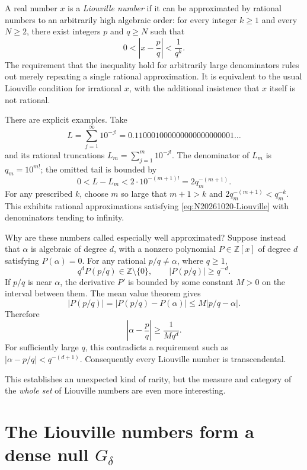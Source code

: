 A real number \(x\) is a \emph{Liouville number} if it can be approximated by rational numbers to an arbitrarily high algebraic order: for every integer \(k\ge1\) and every \(N\ge2\), there exist integers \(p\) and \(q\ge N\) such that
\begin{equation}
 0<\left|x-\frac pq\right|<\frac1{q^k}.
 \label{eq:N20261020-Liouville}
\end{equation}
The requirement that the inequality hold for arbitrarily large denominators rules out merely repeating a single rational approximation. It is equivalent to the usual Liouville condition for irrational \(x\), with the additional insistence that \(x\) itself is not rational.

There are explicit examples. Take
\[
 L=\sum_{j=1}^\infty10^{-j!}
  =0.110001000000000000000001\ldots
\]
and its rational truncations \(L_m=\sum_{j=1}^{m}10^{-j!}\). The denominator of \(L_m\) is \(q_m=10^{m!}\); the omitted tail is bounded by
\[
 0<L-L_m<2\cdot10^{-(m+1)!}
       =2q_m^{-(m+1)}.
\]
For any prescribed \(k\), choose \(m\) so large that \(m+1>k\) and \(2q_m^{-(m+1)}<q_m^{-k}\). This exhibits rational approximations satisfying \eqref{eq:N20261020-Liouville} with denominators tending to infinity.

Why are these numbers called especially well approximated? Suppose instead that \(\alpha\) is algebraic of degree \(d\), with a nonzero polynomial \(P\in\mathbb Z[x]\) of degree \(d\) satisfying \(P(\alpha)=0\). For any rational \(p/q\ne\alpha\), where \(q\ge1\),
\[
 q^dP(p/q)\in\mathbb Z\setminus\{0\},
 \qquad |P(p/q)|\ge q^{-d}.
\]
If \(p/q\) is near \(\alpha\), the derivative \(P'\) is bounded by some constant \(M>0\) on the interval between them. The mean value theorem gives
\[
 |P(p/q)|
 =|P(p/q)-P(\alpha)|
 \le M|p/q-\alpha|.
\]
Therefore
\begin{equation}
 \left|\alpha-\frac pq\right|
 \ge\frac1{Mq^d}.
 \label{eq:N20261020-algebraic-bound}
\end{equation}
For sufficiently large \(q\), this contradicts a requirement such as
\(|\alpha-p/q|<q^{-(d+1)}\). Consequently every Liouville number is transcendental.

This establishes an unexpected kind of rarity, but the measure and category of the \emph{whole set} of Liouville numbers are even more interesting.

\section{The Liouville numbers form a dense null \(G_\delta\)}

